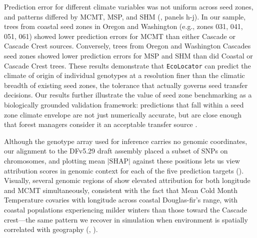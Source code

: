 \documentclass[]{article}
\newcommand{\dfir}{Douglas-fir\xspace}
\newcommand{\ecolocator}{\texttt{EcoLocator}\xspace}
\providecommand{\revpoint}[2]{}%
\begin{document}
Prediction error for different climate variables was not uniform across seed zones,
and patterns differed by MCMT, MSP, and SHM
(, panels h-j). In our sample, trees from coastal seed 
zones in Oregon and Washington (e.g., zones 031, 041, 051, 061) showed lower prediction
errors for MCMT than either Cascade or Cascade Crest sources.
Conversely, trees from Oregon and Washington Cascades seed zones showed
lower prediction errors for MSP and SHM than did Coastal or Cascade Crest trees. 
These results demonstrate that \ecolocator
can predict the climate of origin of individual genotypes
at a resolution finer than the climatic breadth of existing seed zones,
the tolerance that actually governs seed transfer decisions.
Our results further illustrate the value of seed zone benchmarking
as a biologically grounded validation framework:
predictions that fall within a seed zone climate envelope
are not just numerically accurate,
but are close enough that forest managers
consider it an acceptable transfer source
\citep{randall_forest_1996, randall_washington_2002}\revpoint{1}{18}.

Although the genotype array used for inference carries no genomic coordinates,
our alignment to the DFv5.29 draft assembly placed a subset of SNPs
on chromosomes, and plotting mean $\lvert\mathrm{SHAP}\rvert$ against these positions
lets us view attribution scores in genomic context for each of the
five prediction targets ().
Visually, several genomic regions of  show elevated attribution for both longitude and
MCMT simultaneously, consistent with the fact that Mean Cold Month
Temperature covaries with longitude across coastal \dfir's range,
with coastal populations experiencing milder winters than those toward 
the Cascade crest---the same pattern we recover in simulation when 
environment is spatially correlated with geography (, ). 
\end{document}
